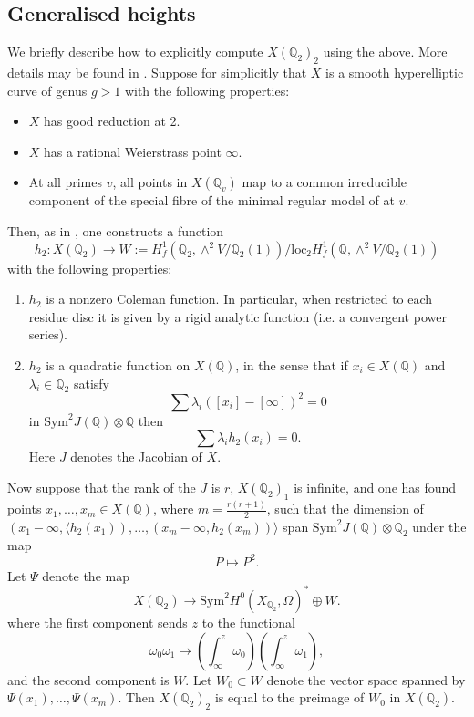 \documentclass[11pt]{amsart}
\def\Q{\mathbb Q}
\theoremstyle{plain}
\newtheorem{lemma}{Lemma}
\theoremstyle{definition}
\newcommand{\Sym}{\mathrm{Sym}}
\newcommand{\loc}{\mathrm{loc}}
\begin{document}
\subsection{Generalised heights}
We briefly describe how to explicitly compute $X(\Q _2 )_2$ using the above. More details may be found in \cite{BKC}. Suppose for simplicitly that $X$ is a smooth hyperelliptic curve of genus $g>1$ with the following properties:
\begin{itemize}
\item $X$ has good reduction at 2.
\item $X$ has a rational Weierstrass point $\infty $.
\item At all primes $v$, all points in $X(\Q _v )$ map to a common irreducible component of the special fibre of the minimal regular model of at $v$.
\end{itemize}

Then, as in \cite{QC2}, one constructs a function
\[
h_2 :X(\Q _2 )\to W:=H^1 _f (\Q _2 ,\wedge ^2 V/\Q _2 (1))/\loc _2 H^1 _f (\Q  ,\wedge ^2 V/\Q _2 (1))
\]
with the following properties:
\begin{enumerate}
\item $h_2$ is a nonzero Coleman function. In particular, when restricted to each residue disc it is given by a rigid analytic function (i.e. a convergent power series).
\item $h_2 $ is a quadratic function on $X(\Q )$, in the sense that if $x_i \in X(\Q )$ and $\lambda _i \in \Q _2 $ satisfy 
\[
\sum \lambda _i ([x_i ]-[\infty ])^2 =0
\]
in $\Sym ^2 J(\Q )\otimes \Q $ then 
\[
\sum \lambda _i h_2 (x_i )=0.
\]
Here $J$ denotes the Jacobian of $X$.
\end{enumerate}
Now suppose that the rank of the $J$ is $r$, $X(\Q _2 )_1$ is infinite, and one has found points $x_1 ,\ldots ,x_m \in X(\Q )$, where $m=\frac{r(r+1)}{2}$, such that the dimension of $(x_1 -\infty , \langle h_2 (x_1 )) ,\ldots ,(x_m -\infty , h_2 (x_m ))\rangle $ span $\Sym ^2 J(\Q )\otimes \Q _2$ under the map
\[
P\mapsto P^2 .
\]
Let $\Psi $ denote the map
\[
X(\Q _2 )\to \Sym ^2 H^0 (X_{\Q _2 },\Omega )^* \oplus W.
\]
where the first component sends $z$ to the functional
\[
\omega _0 \omega _1 \mapsto (\int ^z _{\infty }\omega _0 )(\int ^z _{\infty }\omega _1 ),
\]
and the second component is $W$.
Let $W_0 \subset W$ denote the vector space spanned by $\Psi (x_1 ),\ldots ,\Psi (x_m )$. Then $X(\Q _2 )_2$ is equal to the preimage of $W_0$ in $X(\Q _2 )$.
\end{document}
